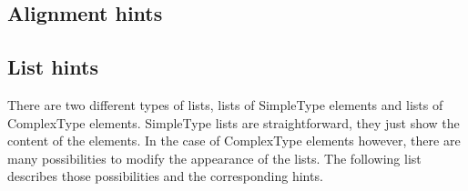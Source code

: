 \subsection{ Alignment hints}







\subsection{ List hints}
There are two different types of lists, lists of SimpleType elements and lists of ComplexType elements. SimpleType lists are straightforward, they just show the content of the elements. In the case of ComplexType elements however, there are many possibilities to modify the appearance of the lists. The following list describes those possibilities and the corresponding hints.


